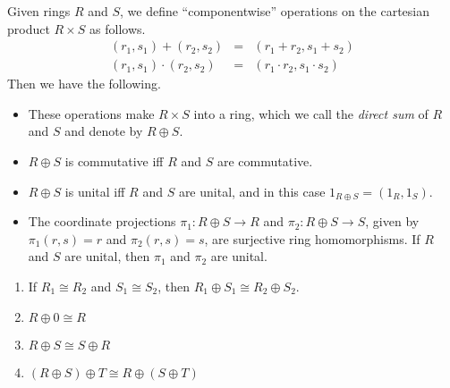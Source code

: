 \documentclass{article}
\begin{document}

\begin{thm}
Given rings $R$ and $S$, we define ``componentwise'' operations on the cartesian product $R \times S$ as follows.
\begin{eqnarray*}
(r_1, s_1) + (r_2, s_2) & = & (r_1 + r_2, s_1 + s_2) \\
(r_1, s_1) \cdot (r_2, s_2) & = & (r_1 \cdot r_2, s_1 \cdot s_2)
\end{eqnarray*}
Then we have the following.
\begin{itemize}
\item These operations make $R \times S$ into a ring, which we call the \emph{direct sum} of $R$ and $S$ and denote by $R \oplus S$.
\item $R \oplus S$ is commutative iff $R$ and $S$ are commutative.
\item $R \oplus S$ is unital iff $R$ and $S$ are unital, and in this case $1_{R \oplus S} = (1_R, 1_S)$.
\item The coordinate projections $\pi_1 : R \oplus S \rightarrow R$ and $\pi_2 : R \oplus S \rightarrow S$, given by $\pi_1(r,s) = r$ and $\pi_2(r,s) = s$, are surjective ring homomorphisms. If $R$ and $S$ are unital, then $\pi_1$ and $\pi_2$ are unital.
\end{itemize}
\end{thm}

\begin{prop} \mbox{}
\begin{enumerate}
\item If $R_1 \cong R_2$ and $S_1 \cong S_2$, then $R_1 \oplus S_1 \cong R_2 \oplus S_2$.
\item $R \oplus 0 \cong R$
\item $R \oplus S \cong S \oplus R$
\item $(R \oplus S) \oplus T \cong R \oplus (S \oplus T)$
\end{enumerate}
\end{prop}
\end{document}
